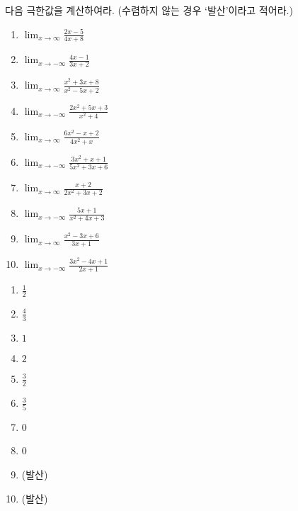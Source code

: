 \documentclass[a4paper]{oblivoir}
\begin{document}
%
\begin{Exercise}
다음 극한값을 계산하여라.
(수렴하지 않는 경우 `발산'이라고 적어라.)
\begin{enumerate}[(1)]
\item
\(\displaystyle\lim_{x\to\infty}\frac{2x-5}{4x+8}\)
\item
\(\displaystyle\lim_{x\to-\infty}\frac{4x-1}{3x+2}\)
\item
\(\displaystyle\lim_{x\to\infty}\frac{x^2+3x+8}{x^2-5x+2}\)
\item
\(\displaystyle\lim_{x\to-\infty}\frac{2x^2+5x+3}{x^2+4}\)
\item
\(\displaystyle\lim_{x\to\infty}\frac{6x^2-x+2}{4x^2+x}\)
\item
\(\displaystyle\lim_{x\to-\infty}\frac{3x^2+x+1}{5x^2+3x+6}\)
\item
\(\displaystyle\lim_{x\to\infty}\frac{x+2}{2x^2+3x+2}\)
\item
\(\displaystyle\lim_{x\to-\infty}\frac{5x+1}{x^2+4x+3}\)
\item
\(\displaystyle\lim_{x\to\infty}\frac{x^2-3x+6}{3x+1}\)
\item
\(\displaystyle\lim_{x\to-\infty}\frac{3x^2-4x+1}{2x+1}\)
\end{enumerate}
\end{Exercise}

\begin{Answer}
\begin{enumerate}[(1)]
\item
\(\frac12\)
\item
\(\frac43\)
\item
\(1\)
\item
\(2\)
\item
\(\frac32\)
\item
\(\frac35\)
\item
0
\item
0
\item
(발산)
\item
(발산)
\end{enumerate}
\end{Answer}

\newpage
\shipoutAnswer
\end{document}
